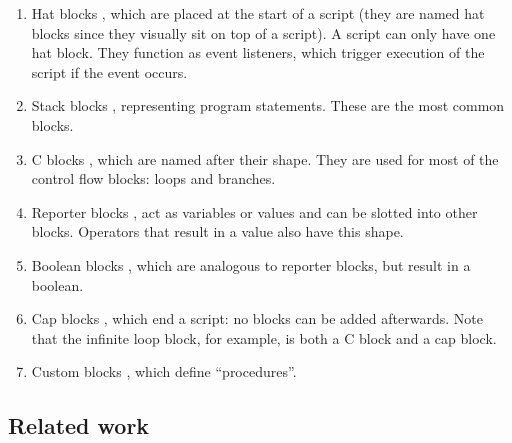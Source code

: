 \documentclass[../main]{subfiles}
\begin{document}
\begin{enumerate}
    \item Hat blocks \scratchinline{\blockinit{\hspace{1em}\dots\hspace*{1em}}}, which are placed at the start of a script (they are named hat blocks since they visually sit on top of a script).
        A script can only have one hat block.
        They function as event listeners, which trigger execution of the script if the event occurs.
    \item Stack blocks \scratchinline{\blockmove{\hspace{1em}\dots\hspace*{0.5cm}}}, representing program statements.
        These are the most common blocks.
    \item C blocks \scratchinline{\blockif{\hspace{1em}\dots\hspace*{1em}}{\blockspace[0.2]}}, which are named after their shape.
        They are used for most of the control flow blocks: loops and branches.
    \item Reporter blocks \ovalmove{\hspace{1em}\dots\hspace*{1em}}, act as variables or values and can be slotted into other blocks.
        Operators that result in a value also have this shape.
    \item Boolean blocks \boolsensing{\hspace{1em}\dots\hspace*{1em}}, which are analogous to reporter blocks, but result in a boolean.
    \item Cap blocks \scratchinline{\blockstop{\hspace{1em}\dots\hspace*{1em}}}, which end a script: no blocks can be added afterwards.
        Note that the infinite loop block, for example, is both a C block and a cap block.
    \item Custom blocks , which define ``procedures''.
\end{enumerate}

\subsection{Related work}\label{subsec:execution-related-work}
\end{document}
